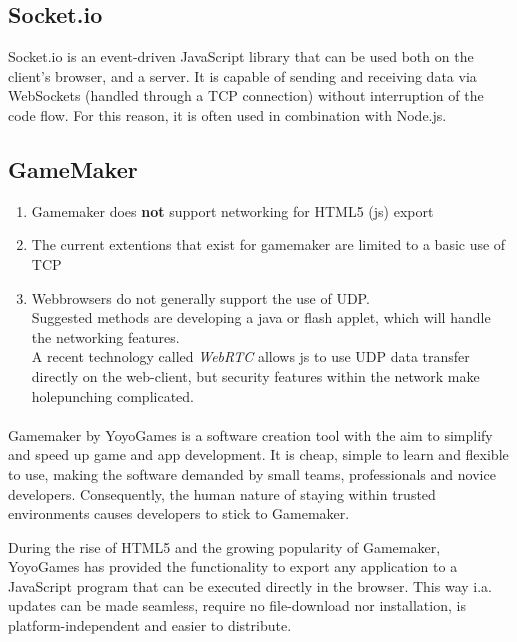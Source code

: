 \documentclass[bsc,frontabs,twoside,singlespacing,parskip,deptreport]{infthesis}     %
\begin{document}
\subsection{Socket.io}
Socket.io is an event-driven JavaScript library that can be used both on the client's browser, and a server\cite{Socketio}. It is capable of sending and receiving data via WebSockets (handled through a TCP connection) without interruption of the code flow\cite{Socketio_Benchmark}\cite{Socketio_TCP_Benchmark}. For this reason, it is often used in combination with Node.js.

\subsection{GameMaker}

\begin{enumerate}
\item Gamemaker does \textbf{not} support networking for HTML5 (js) export
\item The current extentions that exist for gamemaker are limited to a basic use of TCP
\item Webbrowsers do not generally support the use of UDP.
\\Suggested methods are developing a java or flash applet, which will handle the networking features.
\\A recent technology called \emph{WebRTC} allows js to use UDP data transfer directly on the web-client, but security features  within the network make holepunching complicated.
\end{enumerate} 

\paragraph{}Gamemaker by YoyoGames is a software creation tool with the aim to simplify and speed up game and app development. It is cheap, simple to learn and flexible to use, making the software demanded by small teams, professionals and novice developers. Consequently, the human nature of staying within trusted environments causes developers to stick to Gamemaker.

During the rise of HTML5 and the growing popularity of Gamemaker, YoyoGames has provided the functionality to export any application to a JavaScript program that can be executed directly in the browser. This way i.a. updates can be made seamless, require no file-download nor installation, is platform-independent and easier to distribute.
\end{document}
